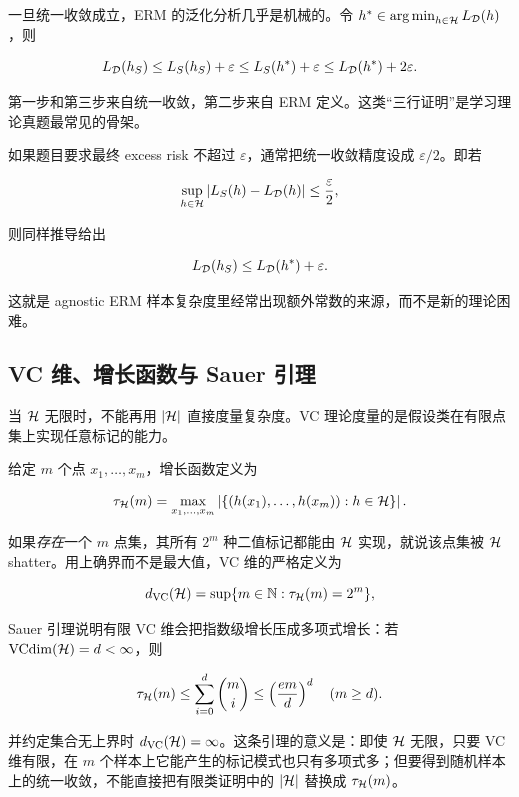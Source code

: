 一旦统一收敛成立，ERM 的泛化分析几乎是机械的。令 \(h^*\in\operatorname*{arg\,min}_{h\in\mathcal{H}}L_{\mathcal{D}}(h)\)，则

\[
  L_{\mathcal{D}}(h_S)
  \le L_S(h_S)+\varepsilon
  \le L_S(h^*)+\varepsilon
  \le L_{\mathcal{D}}(h^*)+2\varepsilon.
\]

第一步和第三步来自统一收敛，第二步来自 ERM 定义。这类“三行证明”是学习理论真题最常见的骨架。

如果题目要求最终 excess risk 不超过 \(\varepsilon\)，通常把统一收敛精度设成 \(\varepsilon/2\)。即若

\[
  \sup_{h\in\mathcal{H}}
  |L_S(h)-L_{\mathcal{D}}(h)|
  \le \frac{\varepsilon}{2},
\]

则同样推导给出

\[
  L_{\mathcal{D}}(h_S)
  \le
  L_{\mathcal{D}}(h^*)+\varepsilon.
\]

这就是 agnostic ERM 样本复杂度里经常出现额外常数的来源，而不是新的理论困难。

\subsection{VC 维、增长函数与 Sauer 引理}




当 \(\mathcal{H}\) 无限时，不能再用 \(|\mathcal{H}|\) 直接度量复杂度。VC 理论度量的是假设类在有限点集上实现任意标记的能力。

 给定 \(m\) 个点 \(x_1,\ldots,x_m\)，增长函数定义为

\[
  \tau_{\mathcal{H}}(m)
  =
  \max_{x_1,\ldots,x_m}
  \left|
  \{
    (h(x_1),\ldots,h(x_m)):h\in\mathcal{H}
  \}
  \right|.
\]

如果\emph{存在}一个 \(m\) 点集，其所有 \(2^m\) 种二值标记都能由 \(\mathcal{H}\) 实现，就说该点集被 \(\mathcal{H}\) shatter。用上确界而不是最大值，VC 维的严格定义为

\[
  d_{\mathrm{VC}}(\mathcal{H})
  =
  \sup\{m\in\mathbb{N}:\tau_{\mathcal{H}}(m)=2^m\},
\]

Sauer 引理说明有限 VC 维会把指数级增长压成多项式增长：若 \(\operatorname{VCdim}(\mathcal{H})=d<\infty\)，则

\[
  \tau_{\mathcal{H}}(m)
  \le
  \sum_{i=0}^{d}\binom{m}{i}
  \le
  \left(\frac{em}{d}\right)^d
  \quad (m\ge d).
\]

并约定集合无上界时 \(d_{\mathrm{VC}}(\mathcal{H})=\infty\)。这条引理的意义是：即使 \(\mathcal{H}\) 无限，只要 VC 维有限，在 \(m\) 个样本上它能产生的标记模式也只有多项式多；但要得到随机样本上的统一收敛，不能直接把有限类证明中的 \(|\mathcal{H}|\) 替换成 \(\tau_{\mathcal{H}}(m)\)。

